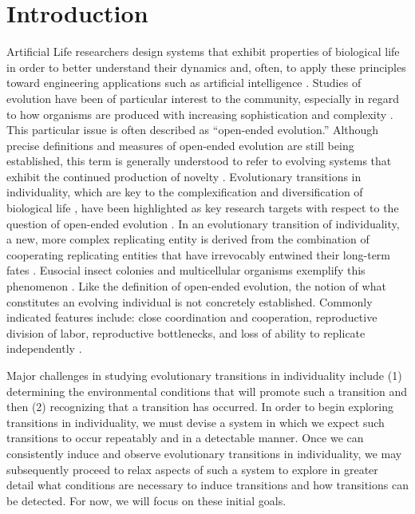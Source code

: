 \section{Introduction}

Artificial Life researchers design systems that exhibit properties of biological life in order to better understand their dynamics and, often, to apply these principles toward engineering applications such as artificial intelligence \citep{bedau2003artificial}.
Studies of evolution have been of particular interest to the community, especially in regard to how organisms are produced with increasing sophistication and complexity \citep{goldsby2017increasing}.
This particular issue is often described as ``open-ended evolution.''
Although precise definitions and measures of open-ended evolution are still being established, this term is generally understood to refer to evolving systems that exhibit the continued production of novelty \citep{taylor2016open}.
Evolutionary transitions in individuality, which are key to the complexification and diversification of biological life \citep{smith1997major}, have been highlighted as key research targets with respect to the question of open-ended evolution \citep{ray1996evolving, banzhaf2016defining}.
In an evolutionary transition of individuality, a new, more complex replicating entity is derived from the combination of cooperating replicating entities that have irrevocably entwined their long-term fates \citep{west2015major}.
Eusocial insect colonies and multicellular organisms exemplify this phenomenon \citep{smith1997major}.
Like the definition of open-ended evolution, the notion of what constitutes an evolving individual is not concretely established.
Commonly indicated features include:
close coordination and cooperation, reproductive division of labor, reproductive bottlenecks, and loss of ability to replicate independently
\citep{ereshefsky2015rethinking, bouchard2013symbiotic}.

Major challenges in studying evolutionary transitions in individuality include (1) determining the environmental conditions that will promote such a transition and then (2) recognizing that a transition has occurred.
In order to begin exploring transitions in individuality, we must devise a system in which we expect such transitions to occur repeatably and in a detectable manner.
Once we can consistently induce and observe evolutionary transitions in individuality, we may subsequently proceed to relax aspects of such a system to explore in greater detail what conditions are necessary to induce transitions and how transitions can be detected.
For now, we will focus on these initial goals.

